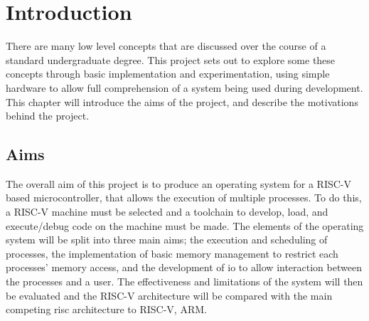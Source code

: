 \chapter{Introduction}
\label{cha:intro}
There are many low level concepts that are discussed over the course of a standard undergraduate degree. This project sets out to explore some these concepts through basic implementation and experimentation, using simple hardware to allow full comprehension of a system being used during development. This chapter will introduce the aims of the project, and describe the motivations behind the project.
\section{Aims}
The overall aim of this project is to produce an operating system for a RISC-V based microcontroller, that allows the execution of multiple processes. To do this, a RISC-V machine must be selected and a toolchain to develop, load, and execute/debug code on the machine must be made. The elements of the operating system will be split into three main aims; the execution and scheduling of processes, the implementation of basic memory management to restrict each processes' memory access, and the development of \ac{io} to allow interaction between the processes and a user. The effectiveness and limitations of the system will then be evaluated and the RISC-V architecture will be compared with the main competing \ac{risc} architecture to RISC-V, ARM. 

